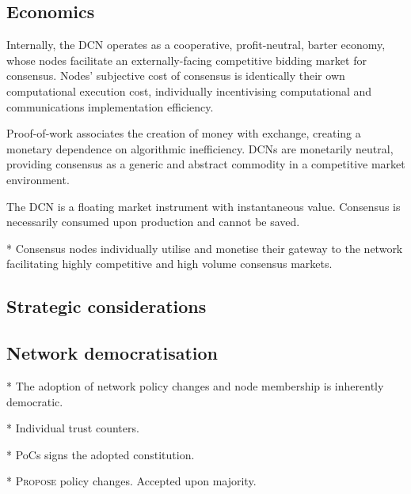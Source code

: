 \subsection{Economics}

Internally, the DCN operates as a cooperative, profit-neutral, barter economy, whose nodes facilitate an externally-facing competitive bidding market for consensus. Nodes' subjective cost of consensus is identically their own computational execution cost, individually incentivising computational and communications implementation efficiency.

Proof-of-work associates the creation of money with exchange, creating a monetary dependence on algorithmic inefficiency. DCNs are monetarily neutral, providing consensus as a generic and abstract commodity in a competitive market environment.

The DCN is a floating market instrument with instantaneous value. Consensus is necessarily consumed upon production and cannot be saved.

* Consensus nodes individually utilise and monetise their gateway to the network facilitating highly competitive and high volume consensus markets.

\subsection{Strategic considerations} \label{sec:strategic_cons}


\subsection{Network democratisation}

* The adoption of network policy changes and node membership is inherently democratic.

* Individual trust counters.

* PoCs signs the adopted constitution.

* \textsc{Propose} policy changes. Accepted upon majority.





